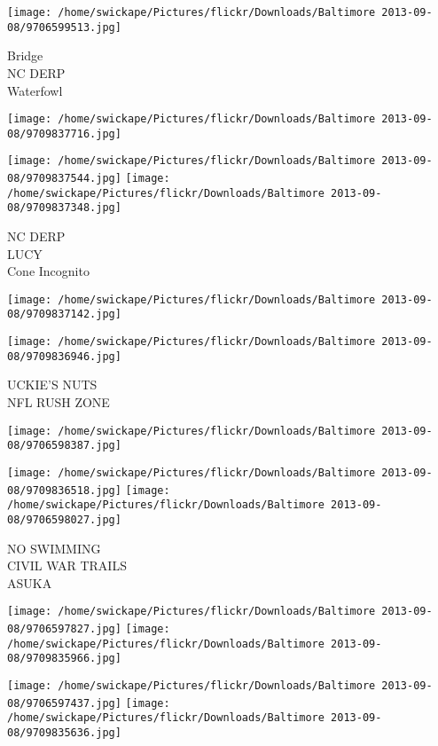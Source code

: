 \documentclass[10pt,letterpaper]{article}
\begin{document}
\texttt{[image: /home/swickape/Pictures/flickr/Downloads/Baltimore 2013-09-08/9706599513.jpg]}

Bridge\\
NC DERP\\
Waterfowl\\
\pagebreak

\texttt{[image: /home/swickape/Pictures/flickr/Downloads/Baltimore 2013-09-08/9709837716.jpg]}

\vspace{0.25in}
\texttt{[image: /home/swickape/Pictures/flickr/Downloads/Baltimore 2013-09-08/9709837544.jpg]}
\texttt{[image: /home/swickape/Pictures/flickr/Downloads/Baltimore 2013-09-08/9709837348.jpg]}

NC DERP\\
LUCY\\
Cone Incognito\\
\pagebreak

\texttt{[image: /home/swickape/Pictures/flickr/Downloads/Baltimore 2013-09-08/9709837142.jpg]}

\vspace{0.25in}
\texttt{[image: /home/swickape/Pictures/flickr/Downloads/Baltimore 2013-09-08/9709836946.jpg]}

UCKIE'S NUTS\\
NFL RUSH ZONE\\
\pagebreak

\texttt{[image: /home/swickape/Pictures/flickr/Downloads/Baltimore 2013-09-08/9706598387.jpg]}

\vspace{0.25in}
\texttt{[image: /home/swickape/Pictures/flickr/Downloads/Baltimore 2013-09-08/9709836518.jpg]}
\texttt{[image: /home/swickape/Pictures/flickr/Downloads/Baltimore 2013-09-08/9706598027.jpg]}

NO SWIMMING\\
CIVIL WAR TRAILS\\
ASUKA\\
\pagebreak

\texttt{[image: /home/swickape/Pictures/flickr/Downloads/Baltimore 2013-09-08/9706597827.jpg]}
\texttt{[image: /home/swickape/Pictures/flickr/Downloads/Baltimore 2013-09-08/9709835966.jpg]}

\texttt{[image: /home/swickape/Pictures/flickr/Downloads/Baltimore 2013-09-08/9706597437.jpg]}
\texttt{[image: /home/swickape/Pictures/flickr/Downloads/Baltimore 2013-09-08/9709835636.jpg]}
\end{document}
